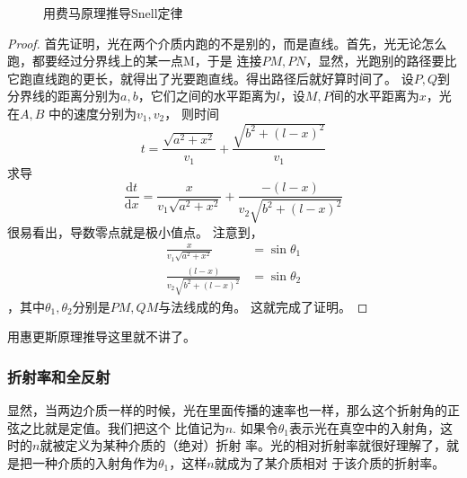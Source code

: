 \begin{figure}[!hbpt]
\begin{center}
\end{center}
\caption{用费马原理推导Snell定律}
\label{fig:DeriveSenllsLawFromFermats}
\end{figure}

\begin{proof}
首先证明，光在两个介质内跑的不是别的，而是直线。首先，光无论怎么跑，都要经过分界线上的某一点M，于是
连接$PM,PN$，显然，光跑别的路径要比它跑直线跑的更长，就得出了光要跑直线。得出路径后就好算时间了。
设$P,Q$到分界线的距离分别为$a,b$，它们之间的水平距离为$l$，设$M,P$间的水平距离为$x$，光在$A,B$
中的速度分别为$v_1,v_2$，
则时间
\begin{equation}
t = \frac{\sqrt{a^2 + x^2}}{v_1} + \frac{\sqrt{b^2 + (l-x)^2}}{v_1}
\end{equation}
求导
\begin{equation}
\frac{\mathrm{d}t}{\mathrm{d}x} = \frac{x}{v_1\sqrt{a^2 + x^2}} + 
\frac{-(l-x)}{v_2\sqrt{b^2 + (l-x)^2}}
\end{equation}
很易看出，导数零点就是极小值点。
注意到，
\begin{align*}
\frac{x}{v_1\sqrt{a^2 + x^2}} &= \sin{\theta_1} \\
\frac{(l-x)}{v_2\sqrt{b^2 + (l-x)^2}} &= \sin{\theta_2}
\end{align*}
，其中$\theta_1,\theta_2$分别是$PM,QM$与法线成的角。
这就完成了证明。
\end{proof}

用惠更斯原理推导这里就不讲了。

\subsubsection{折射率和全反射}
显然，当两边介质一样的时候，光在里面传播的速率也一样，那么这个折射角的正弦之比就是定值。我们把这个
比值记为$n$. 如果令$\theta_1$表示光在真空中的入射角，这时的$n$就被定义为某种介质的（绝对）折射
率。光的相对折射率就很好理解了，就是把一种介质的入射角作为$\theta_1$，这样$n$就成为了某介质相对
于该介质的折射率。

